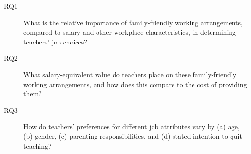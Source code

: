 \begin{description}
  \item[RQ1] What is the relative importance of family-friendly working arrangements, compared
    to salary and other workplace characteristics, in determining teachers' job choices?
  \item[RQ2] What salary-equivalent value do teachers place on these family-friendly working
    arrangements, and how does this compare to the cost of providing them?
  \item[RQ3] How do teachers' preferences for different job attributes vary by (a) age, (b)
    gender, (c) parenting responsibilities, and (d) stated intention to quit teaching?
\end{description}

